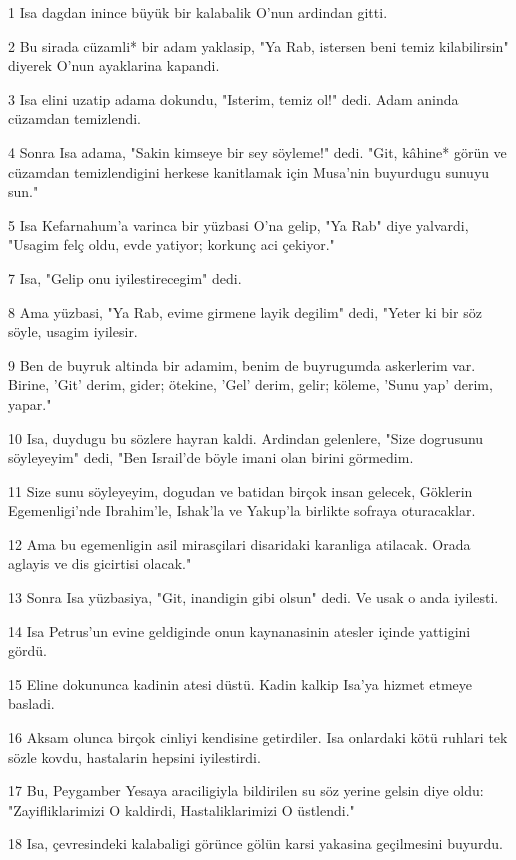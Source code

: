 \par 1 Isa dagdan inince büyük bir kalabalik O'nun ardindan gitti.
\par 2 Bu sirada cüzamli* bir adam yaklasip, "Ya Rab, istersen beni temiz kilabilirsin" diyerek O'nun ayaklarina kapandi.
\par 3 Isa elini uzatip adama dokundu, "Isterim, temiz ol!" dedi. Adam aninda cüzamdan temizlendi.
\par 4 Sonra Isa adama, "Sakin kimseye bir sey söyleme!" dedi. "Git, kâhine* görün ve cüzamdan temizlendigini herkese kanitlamak için Musa'nin buyurdugu sunuyu sun."
\par 5 Isa Kefarnahum'a varinca bir yüzbasi O'na gelip, "Ya Rab" diye yalvardi, "Usagim felç oldu, evde yatiyor; korkunç aci çekiyor."
\par 7 Isa, "Gelip onu iyilestirecegim" dedi.
\par 8 Ama yüzbasi, "Ya Rab, evime girmene layik degilim" dedi, "Yeter ki bir söz söyle, usagim iyilesir.
\par 9 Ben de buyruk altinda bir adamim, benim de buyrugumda askerlerim var. Birine, 'Git' derim, gider; ötekine, 'Gel' derim, gelir; köleme, 'Sunu yap' derim, yapar."
\par 10 Isa, duydugu bu sözlere hayran kaldi. Ardindan gelenlere, "Size dogrusunu söyleyeyim" dedi, "Ben Israil'de böyle imani olan birini görmedim.
\par 11 Size sunu söyleyeyim, dogudan ve batidan birçok insan gelecek, Göklerin Egemenligi'nde Ibrahim'le, Ishak'la ve Yakup'la birlikte sofraya oturacaklar.
\par 12 Ama bu egemenligin asil mirasçilari disaridaki karanliga atilacak. Orada aglayis ve dis gicirtisi olacak."
\par 13 Sonra Isa yüzbasiya, "Git, inandigin gibi olsun" dedi. Ve usak o anda iyilesti.
\par 14 Isa Petrus'un evine geldiginde onun kaynanasinin atesler içinde yattigini gördü.
\par 15 Eline dokununca kadinin atesi düstü. Kadin kalkip Isa'ya hizmet etmeye basladi.
\par 16 Aksam olunca birçok cinliyi kendisine getirdiler. Isa onlardaki kötü ruhlari tek sözle kovdu, hastalarin hepsini iyilestirdi.
\par 17 Bu, Peygamber Yesaya araciligiyla bildirilen su söz yerine gelsin diye oldu: "Zayifliklarimizi O kaldirdi, Hastaliklarimizi O üstlendi."
\par 18 Isa, çevresindeki kalabaligi görünce gölün karsi yakasina geçilmesini buyurdu.
